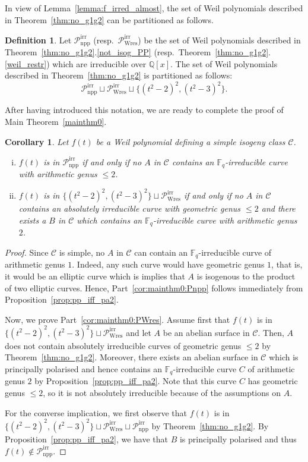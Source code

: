 \documentclass[11pt]{amsart}
\newcommand\Fq{\mathbb{F}_q}
\newcommand\Q{\mathbb{Q}}
\newcommand\cC{\mathcal{C}}
\theoremstyle{plain}
\newtheorem{corollary}[theorem]{Corollary}
\theoremstyle{definition}
\newtheorem{definition}[theorem]{Definition}
\newcommand\PirrA{\mathcal{P}^\mathrm{irr}_\mathrm{npp}}
\newcommand\PirrB{\mathcal{P}^\mathrm{irr}_\mathrm{Wres}}
\begin{document}
In view of Lemma~\ref{lemma:f_irred_almost}, the set of Weil polynomials described in Theorem~\ref{thm:no_g1g2} can be partitioned as follows.

\begin{definition}\label{df:partition}
    Let $\PirrA$ (resp.~$\PirrB$) be the set of Weil polynomials described in Theorem~\ref{thm:no_g1g2}.\ref{not_isog_PP} (resp.~Theorem~\ref{thm:no_g1g2}.\ref{weil_restr}) which are irreducible over $\Q[x]$.
    The set of Weil polynomials described in Theorem~\ref{thm:no_g1g2} is partitioned as follows:
    \[ \PirrA\sqcup\PirrB \sqcup  \{ (t^2-2)^2 , (t^2-3)^2 \}.\]
\end{definition}

After having introduced this notation, we are ready to complete the proof of Main Theorem~\ref{mainthm0}.
\begin{corollary}\label{cor:mainthm0}
    Let $f(t)$ be a Weil polynomial defining a simple isogeny class $\cC$.
    \begin{enumerate}[(i)]
        \item \label{cor:mainthm0:Pnpp} $f(t)$ is in $\PirrA$ if and only if no $A$ in $\cC$ contains an $\Fq$-irreducible curve with arithmetic genus $\leq 2$.
        \item \label{cor:mainthm0:PWres} $f(t)$ is in $\{ (t^2-2)^2 , (t^2-3)^2 \} \sqcup\PirrB$ if and only if no $A$ in $\cC$ contains an absolutely irreducible curve with geometric genus $\leq 2$ and there exists a $B$ in $\cC$ which contains an $\Fq$-irreducible curve with arithmetic genus $2$.
    \end{enumerate}
\end{corollary}
\begin{proof}
    Since $\cC$ is simple, no $A$ in $\cC$ can contain an $\Fq$-irreducible curve of arithmetic genus $1$.
    Indeed, any such curve would have geometric genus $1$, that is, it would be an elliptic curve which is implies that $A$ is isogenous to the product of two elliptic curves.
    Hence, Part~\ref{cor:mainthm0:Pnpp} follows immediately from Proposition~\ref{prop:pp_iff_pa2}.

    Now, we prove Part~\ref{cor:mainthm0:PWres}. 
    Assume first that $f(t)$ is in $\{ (t^2-2)^2 , (t^2-3)^2 \} \sqcup\PirrB$ and let $A$ be an abelian surface in $\cC$.
    Then, $A$ does not contain absolutely irreducible curves of geometric genus $\leq 2$ by Theorem~\ref{thm:no_g1g2}.
    Moreover, there exists an abelian surface in $\cC$ which is principally polarised and hence contains an $\Fq$-irreducible curve $C$ of arithmetic genus $2$ by Proposition~\ref{prop:pp_iff_pa2}.
    Note that this curve $C$ has geometric genus $\leq 2$, so it is not absolutely irreducible because of the assumptions on $A$.
    
    For the converse implication, we first observe that $f(t)$ is in $\{ (t^2-2)^2 , (t^2-3)^2 \} \sqcup\PirrB \sqcup\PirrA$ by Theorem~\ref{thm:no_g1g2}. 
    By Proposition~\ref{prop:pp_iff_pa2}, we have that $B$ is principally polarised and thus $f(t) \not\in \PirrA$.
\end{proof}
\end{document}
